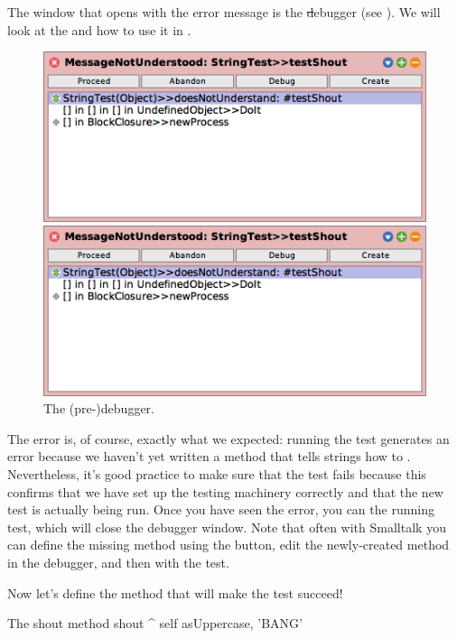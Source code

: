 \documentclass[a4paper,10pt,twoside]{book}
\begin{document}
The window that opens with the error message is the \st debugger (see ).
We will look at the  and how to use it in .

\begin{figure}[hbt]
\ifluluelse
	{\centerline {\includegraphics[width=\textwidth]{Predebugger}}}
	{\centerline {\includegraphics[scale=0.7]{Predebugger}}}
\caption{The (pre-)debugger.}
\label{fig:predebugger}
\end{figure}

The error is, of course, exactly what we expected:  running the test generates an error because we haven't yet written a method that tells strings how to .  
Nevertheless, it's good practice to make sure that the test fails because this confirms that we have set up the testing machinery correctly and that the new test is actually being run.
Once you have seen the error, you can  the running test, which will close the debugger window.
Note that often with Smalltalk you can define the missing method using the  button, edit the newly-created method in the debugger, and then  with the test.

Now let's define the method that will make the test succeed!

\begin{method}[shout]{The shout method}
shout
	^ self asUppercase, 'BANG'
\end{method}
\end{document}
